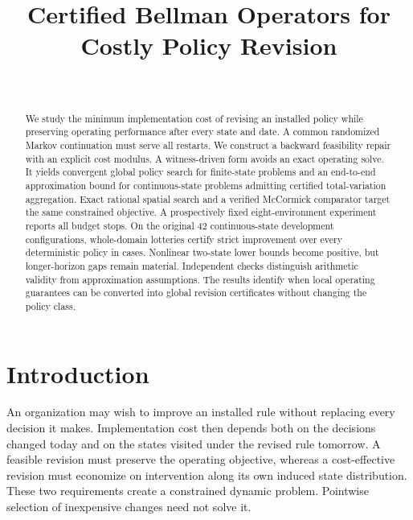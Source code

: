 


\begin{frontmatter}
\title{Certified Bellman Operators for Costly Policy Revision}
\begin{aug}\author[id=au1,addressref={add1}]{~}\address[id=add1]{}\end{aug}
\begin{abstract}
We study the minimum implementation cost of revising an installed policy while preserving operating performance after every state and date. A common randomized Markov continuation must serve all restarts. We construct a backward feasibility repair with an explicit cost modulus. A witness-driven form avoids an exact operating solve. It yields convergent global policy search for finite-state problems and an end-to-end approximation bound for continuous-state problems admitting certified total-variation aggregation. Exact rational spatial search and a verified McCormick comparator target the same constrained objective. A prospectively fixed eight-environment experiment reports all budget stops. On the original 42 continuous-state development configurations, whole-domain lotteries certify strict improvement over every deterministic policy in \PrimaryStrict{} cases. Nonlinear two-state lower bounds become positive, but longer-horizon gaps remain material. Independent checks distinguish arithmetic validity from approximation assumptions. The results identify when local operating guarantees can be converted into global revision certificates without changing the policy class.
\end{abstract}
\begin{keyword}\end{keyword}
\end{frontmatter}

\section{Introduction}\label{sec:introduction}
An organization may wish to improve an installed rule without replacing every decision it makes. Implementation cost then depends both on the decisions changed today and on the states visited under the revised rule tomorrow. A feasible revision must preserve the operating objective, whereas a cost-effective revision must economize on intervention along its own induced state distribution. These two requirements create a constrained dynamic problem. Pointwise selection of inexpensive changes need not solve it.

